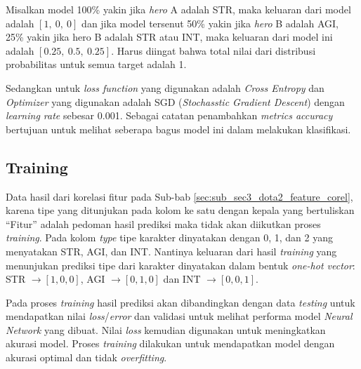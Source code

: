 Misalkan model 100\% yakin jika \textit{hero} A adalah STR, maka keluaran dari model adalah $\left[1,\ 0,\ 0 \right]$ dan jika model tersenut 50\% yakin jika \textit{hero} B adalah AGI, 25\% yakin jika hero B adalah STR atau INT, maka keluaran dari model ini adalah $\left[0.25,\ 0.5,\ 0.25 \right]$. Harus diingat bahwa total nilai dari distribusi probabilitas untuk semua target adalah 1.
\vspace{1ex}

Sedangkan untuk \textit{loss function} yang digunakan adalah \textit{Cross Entropy} dan \textit{Optimizer} yang digunakan adalah SGD (\textit{Stochasstic Gradient Descent}) dengan \textit{learning rate} sebesar 0.001. Sebagai catatan penambahkan \textit{metrics accuracy} bertujuan untuk melihat seberapa bagus model ini dalam melakukan klasifikasi.
\vspace{1ex}

\subsection{Training}
\label{sec:sub_sec3_dota2_train}
\vspace{1ex}

Data hasil dari korelasi fitur pada Sub-bab \ref{sec:sub_sec3_dota2_feature_corel}, karena tipe yang ditunjukan pada kolom ke satu dengan kepala yang bertuliskan ``Fitur'' adalah pedoman hasil prediksi maka tidak akan diikutkan proses \textit{training}. Pada kolom \textit{type} tipe karakter dinyatakan dengan 0, 1, dan 2 yang menyatakan STR, AGI, dan INT. Nantinya keluaran dari hasil \textit{training} yang menunjukan prediksi tipe dari karakter dinyatakan dalam bentuk \textit{one-hot vector}: STR $\rightarrow [1, 0, 0]$, AGI $\rightarrow [0, 1, 0]$ dan INT $\rightarrow [0, 0, 1]$. 
\vspace{1ex}

Pada proses \textit{training} hasil prediksi akan dibandingkan dengan data \textit{testing} untuk mendapatkan nilai \textit{loss}/\textit{error} dan validasi untuk melihat performa model \textit{Neural Network} yang dibuat. Nilai \textit{loss} kemudian digunakan untuk meningkatkan akurasi model. Proses \textit{training} dilakukan untuk mendapatkan model dengan akurasi optimal dan tidak \textit{overfitting}.
\vspace{1ex}

